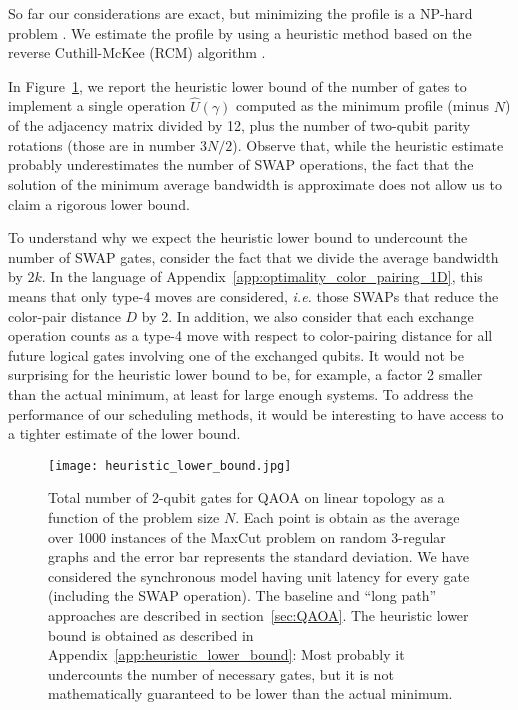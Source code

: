 \documentclass[%
onecolumn,pra,
superscriptaddress,
nofootinbib,
 amsmath,amssymb,
 aps,
11pt,
]{revtex4-1}
\def\note#1{\textbf{\color{red}[#1]}}
\begin{document}
So far our considerations are exact, but minimizing the profile is a NP-hard problem \cite{Garey1990}. We estimate the profile by using a heuristic method based on the reverse Cuthill-McKee (RCM) algorithm \cite{Cuthill1969}.

In Figure~\ref{fig:heuristic_lower_bound}, we report the heuristic lower bound of the number of gates to implement a single operation $\hat{U}(\gamma)$ computed as the minimum profile (minus $N$) of the adjacency matrix divided by 12, plus the number of two-qubit parity rotations (those are in number $3N/2$). Observe that, while the heuristic estimate probably underestimates the number of SWAP operations, the fact that the solution of the minimum average bandwidth is approximate does not allow us to claim a rigorous lower bound.

To understand why we expect the heuristic lower bound to undercount the number of SWAP gates, consider the fact that we divide the average bandwidth by $2k$. In the language of Appendix~\ref{app:optimality_color_pairing_1D}, this means that only type-4 moves are considered, \emph{i.e.} those SWAPs that reduce the color-pair distance $D$ by 2. In addition, we also consider that each exchange operation counts as a type-4 move with respect to color-pairing distance for all future logical gates involving one of the exchanged qubits. It would not be surprising for the heuristic lower bound to be, for example, a factor 2 smaller than the actual minimum, at least for large enough systems. To address the performance of our scheduling methods, it would be interesting to have access to a tighter estimate of the lower bound.

\begin{figure}[bht]
\centering
\texttt{[image: heuristic\_lower\_bound.jpg]}
\caption{
Total number of 2-qubit gates for QAOA on linear topology as a function of the problem size $N$. Each point is obtain as the average over 1000 instances of the MaxCut problem on random 3-regular graphs and the error bar represents the standard deviation. We have considered the synchronous model having unit latency for every gate (including the SWAP operation). The baseline and ``long path'' approaches are described in section~\ref{sec:QAOA}. The heuristic lower bound is obtained as described in Appendix~\ref{app:heuristic_lower_bound}: Most probably it undercounts the number of necessary gates, but it is not mathematically guaranteed to be lower than the actual minimum.
}
\label{fig:heuristic_lower_bound}
\end{figure}
\end{document}

